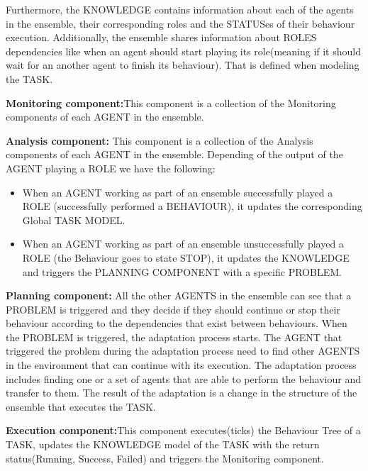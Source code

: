 \documentclass[journal]{IEEEtran}
\theoremstyle{definition}
\begin{document}
Furthermore, the KNOWLEDGE contains information about each of the agents in the ensemble, their corresponding roles and the STATUSes of their behaviour execution. 
Additionally, the ensemble shares information about ROLES dependencies like when an agent should start playing its role(meaning if it should wait for an another agent to finish its behaviour). That is defined when modeling the TASK.

\textbf{Monitoring component:}This component is a collection of the Monitoring components of each AGENT in the ensemble.

\textbf{Analysis component:} 
This component is a collection of the Analysis components of each AGENT in the ensemble. Depending of the output of the AGENT playing a ROLE we have the following:
\begin{itemize}
\item When an AGENT working as part of an ensemble successfully played a ROLE (successfully performed a BEHAVIOUR), it updates the corresponding Global TASK MODEL. 
\item When an AGENT working as part of an ensemble unsuccessfully played a ROLE (the Behaviour goes to state STOP), it updates the KNOWLEDGE and triggers the PLANNING COMPONENT with a specific PROBLEM. 
\end{itemize}

\textbf{Planning component:}
All the other AGENTS in the ensemble can see that a PROBLEM is triggered and they decide if they should continue or stop their behaviour according to the dependencies that exist between behaviours. 
When the PROBLEM is triggered, the adaptation process starts. The AGENT that triggered the problem during the adaptation process need to find other AGENTS in the environment that can continue with its execution. The adaptation process includes finding one or a set of agents that are able to perform the behaviour and transfer to them.
The result of the adaptation is a change in the structure of the ensemble that executes the TASK.

\textbf{Execution component:}This component executes(ticks) the Behaviour Tree of a TASK,  updates the KNOWLEDGE model of the TASK with the return status(Running, Success, Failed) and triggers the Monitoring component.




\end{document}
